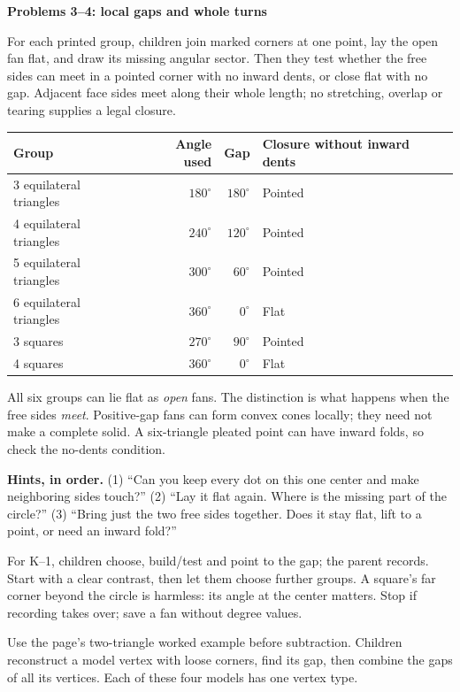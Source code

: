 \documentclass[11pt,letterpaper]{article}
\newcommand{\titleline}[1]{\par{\Large\bfseries #1}\par\vspace{4pt}}
\newcommand{\sub}[1]{\par\vspace{3pt}{\bfseries #1}\par}
\newcommand{\hints}[3]{\textbf{Hints, in order.} (1) #1 (2) #2 (3) #3\par}
\newcommand{\degc}{^{\circ}}
\begin{document}
\newpage
\titleline{Problems 3--4: local gaps and whole turns}
\sub{Problem 3 / student p.3 / fan core at all tables}
For each printed group, children join marked corners at one point, lay the open fan flat, and draw its missing angular sector. Then they test whether the free sides can meet in a pointed corner with no inward dents, or close flat with no gap. Adjacent face sides meet along their whole length; no stretching, overlap or tearing supplies a legal closure.

\begin{center}
\begin{tabular}{|l|r|r|l|}\hline
Group & Angle used & Gap & Closure without inward dents\\\hline
3 equilateral triangles & $180\degc$ & $180\degc$ & Pointed\\
4 equilateral triangles & $240\degc$ & $120\degc$ & Pointed\\
5 equilateral triangles & $300\degc$ & $60\degc$ & Pointed\\
6 equilateral triangles & $360\degc$ & $0\degc$ & Flat\\
3 squares & $270\degc$ & $90\degc$ & Pointed\\
4 squares & $360\degc$ & $0\degc$ & Flat\\\hline
\end{tabular}
\end{center}
All six groups can lie flat as \emph{open} fans. The distinction is what happens when the free sides \emph{meet}. Positive-gap fans can form convex cones locally; they need not make a complete solid. A six-triangle pleated point can have inward folds, so check the no-dents condition.

\hints{``Can you keep every dot on this one center and make neighboring sides touch?''}{``Lay it flat again. Where is the missing part of the circle?''}{``Bring just the two free sides together. Does it stay flat, lift to a point, or need an inward fold?''}
For K--1, children choose, build/test and point to the gap; the parent records. Start with a clear contrast, then let them choose further groups. A square's far corner beyond the circle is harmless: its angle at the center matters. Stop if recording takes over; save a fan without degree values.

\sub{Problem 4 / student p.4 / arithmetic continuation; K--1 by gap copies}
Use the page's two-triangle worked example before subtraction. Children reconstruct a model vertex with loose corners, find its gap, then combine the gaps of all its vertices. Each of these four models has one vertex type.
\end{document}
